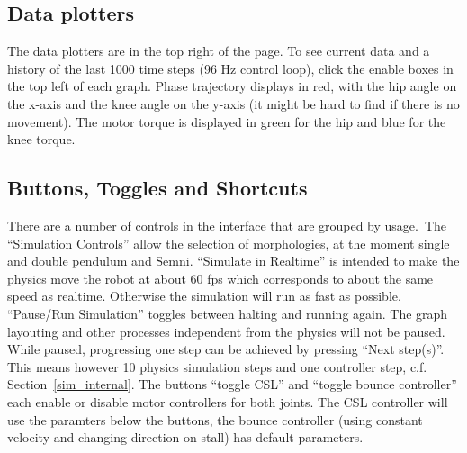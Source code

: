 \documentclass[10pt,a4paper]{article}
\begin{document}
\subsection{Data plotters}

The data plotters are in the top right of the page.
To see current data and a history of the last 1000 time steps (96 Hz control loop), click the enable boxes in the top left of each graph. Phase trajectory displays in red, with the hip angle on the x-axis and the knee angle on the y-axis (it might be hard to find if there is no movement). The motor torque is displayed in green for the hip and blue for the knee torque.

\subsection{Buttons, Toggles and Shortcuts}

There are a number of controls in the interface that are grouped by usage.\ The ``Simulation
Controls'' allow the selection of morphologies, at the moment single and double pendulum and Semni.
``Simulate in Realtime'' is intended to make the physics move the robot at about 60 fps which
corresponds to about the same speed as realtime. Otherwise the simulation will run as fast as
possible. ``Pause/Run Simulation'' toggles between halting and running again. The graph layouting and
other processes independent from the physics will not be paused. While paused, progressing one step
can be achieved by pressing ``Next step(s)''. This means however 10 physics simulation steps and one
controller step, c.f. Section~\ref{sim_internal}. The buttons ``toggle CSL'' and ``toggle bounce
controller'' each enable or disable motor controllers for both joints. The CSL controller will use
the paramters below the buttons, the bounce controller (using constant velocity and changing
direction on stall) has default parameters.
\end{document}
